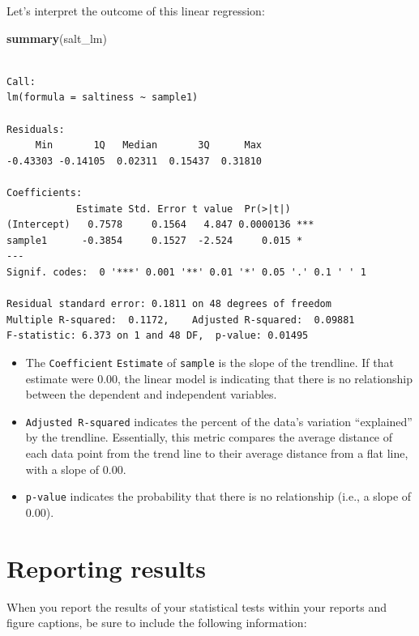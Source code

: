 \documentclass[
]{book}
\newenvironment{Shaded}{\begin{snugshade}}{\end{snugshade}}
\newcommand{\KeywordTok}[1]{\textcolor[rgb]{0.13,0.29,0.53}{\textbf{#1}}}
\newcommand{\NormalTok}[1]{#1}
\begin{document}
Let's interpret the outcome of this linear regression:

\begin{Shaded}
\begin{Highlighting}[]
\KeywordTok{summary}\NormalTok{(salt_lm)}
\end{Highlighting}
\end{Shaded}

\begin{verbatim}

Call:
lm(formula = saltiness ~ sample1)

Residuals:
     Min       1Q   Median       3Q      Max 
-0.43303 -0.14105  0.02311  0.15437  0.31810 

Coefficients:
            Estimate Std. Error t value  Pr(>|t|)    
(Intercept)   0.7578     0.1564   4.847 0.0000136 ***
sample1      -0.3854     0.1527  -2.524     0.015 *  
---
Signif. codes:  0 '***' 0.001 '**' 0.01 '*' 0.05 '.' 0.1 ' ' 1

Residual standard error: 0.1811 on 48 degrees of freedom
Multiple R-squared:  0.1172,    Adjusted R-squared:  0.09881 
F-statistic: 6.373 on 1 and 48 DF,  p-value: 0.01495
\end{verbatim}

\begin{itemize}
\item
  The \texttt{Coefficient} \texttt{Estimate} of \texttt{sample} is the slope of the trendline. If that estimate were 0.00, the linear model is indicating that there is no relationship between the dependent and independent variables.
\item
  \texttt{Adjusted\ R-squared} indicates the percent of the data's variation ``explained'' by the trendline. Essentially, this metric compares the average distance of each data point from the trend line to their average distance from a flat line, with a slope of 0.00.
\item
  \texttt{p-value} indicates the probability that there is no relationship (i.e., a slope of 0.00).
\end{itemize}

\hypertarget{reporting-results}{%
\section*{Reporting results}\label{reporting-results}}

When you report the results of your statistical tests within your reports and figure captions, be sure to include the following information:
\end{document}
